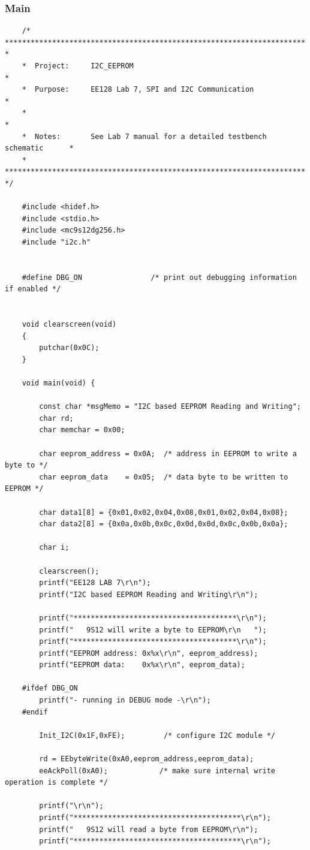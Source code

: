 \documentclass{article}
\begin{document}
	\subsubsection*{Main}
	\begin{lstlisting}
	/* ********************************************************************** *
	*  Project:     I2C_EEPROM                                               *
	*  Purpose:     EE128 Lab 7, SPI and I2C Communication                   *
	*                                                                        *
	*  Notes:       See Lab 7 manual for a detailed testbench schematic      *
	* ********************************************************************** */
	
	#include <hidef.h>
	#include <stdio.h>
	#include <mc9s12dg256.h>
	#include "i2c.h"
	
	
	#define DBG_ON                /* print out debugging information if enabled */
	
	
	void clearscreen(void)
	{
		putchar(0x0C);
	}
	
	void main(void) {
	
		const char *msgMemo = "I2C based EEPROM Reading and Writing";
		char rd;
		char memchar = 0x00;
		
		char eeprom_address = 0x0A;  /* address in EEPROM to write a byte to */
		char eeprom_data    = 0x05;  /* data byte to be written to EEPROM */
		
		char data1[8] = {0x01,0x02,0x04,0x08,0x01,0x02,0x04,0x08};
		char data2[8] = {0x0a,0x0b,0x0c,0x0d,0x0d,0x0c,0x0b,0x0a};
		
		char i;
		
		clearscreen();
		printf("EE128 LAB 7\r\n");
		printf("I2C based EEPROM Reading and Writing\r\n");
		
		printf("**************************************\r\n");
		printf("   9S12 will write a byte to EEPROM\r\n   ");
		printf("**************************************\r\n");
		printf("EEPROM address: 0x%x\r\n", eeprom_address); 
		printf("EEPROM data:    0x%x\r\n", eeprom_data);
	
	#ifdef DBG_ON
		printf("- running in DEBUG mode -\r\n");
	#endif
	
		Init_I2C(0x1F,0xFE);         /* configure I2C module */
		
		rd = EEbyteWrite(0xA0,eeprom_address,eeprom_data);
		eeAckPoll(0xA0);            /* make sure internal write operation is complete */
		
		printf("\r\n");    
		printf("***************************************\r\n");
		printf("   9S12 will read a byte from EEPROM\r\n");
		printf("***************************************\r\n");
		

\end{lstlisting}
\end{document}
